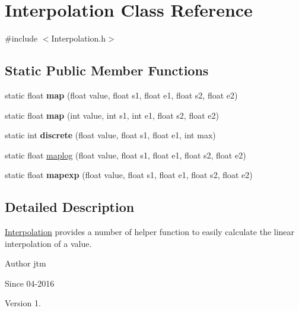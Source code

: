 \hypertarget{classInterpolation}{}\section{Interpolation Class Reference}
\label{classInterpolation}


{\ttfamily \#include $<$Interpolation.\+h$>$}

\subsection*{Static Public Member Functions}
\begin{DoxyCompactItemize}
\item 
static float {\bfseries map} (float value, float s1, float e1, float s2, float e2)\hypertarget{classInterpolation_adfd3003c39c40ec76342274c65017761}{}\label{classInterpolation_adfd3003c39c40ec76342274c65017761}

\item 
static float {\bfseries map} (int value, int s1, int e1, float s2, float e2)\hypertarget{classInterpolation_ac6eab12deb9f79b79200aad3b219e7c3}{}\label{classInterpolation_ac6eab12deb9f79b79200aad3b219e7c3}

\item 
static int {\bfseries discrete} (float value, float s1, float e1, int max)\hypertarget{classInterpolation_a246c72a835822b7674758d657ed44230}{}\label{classInterpolation_a246c72a835822b7674758d657ed44230}

\item 
static float \hyperlink{classInterpolation_a5549f8859f14153da891222a8ff1a22f}{maplog} (float value, float s1, float e1, float s2, float e2)
\item 
static float {\bfseries mapexp} (float value, float s1, float e1, float s2, float e2)\hypertarget{classInterpolation_a08d1fe5e82708ab26a019e9ae9f851c8}{}\label{classInterpolation_a08d1fe5e82708ab26a019e9ae9f851c8}

\end{DoxyCompactItemize}


\subsection{Detailed Description}
\hyperlink{classInterpolation}{Interpolation} provides a number of helper function to easily calculate the linear interpolation of a value.

\begin{DoxyAuthor}{Author}
jtm 
\end{DoxyAuthor}
\begin{DoxySince}{Since}
04-\/2016 
\end{DoxySince}
\begin{DoxyVersion}{Version}
1. 
\end{DoxyVersion}


